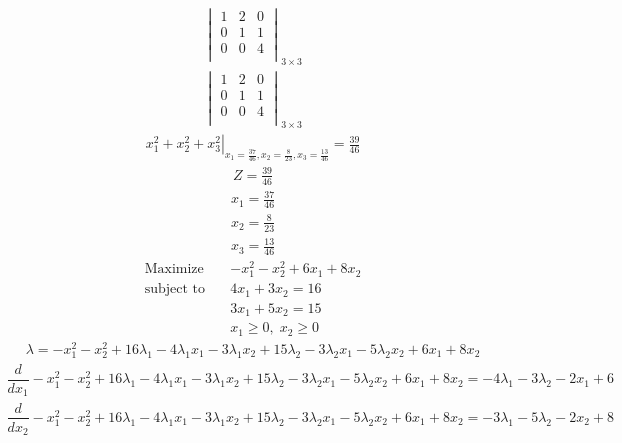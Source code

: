 \documentclass{article}
\begin{document}
\begin{align*}
\begin{vmatrix}
1 & 2 & 0\\
0 & 1 & 1\\
0 & 0 & 4\\
\end{vmatrix}_{3\times 3}
\end{align*}
\begin{align*}
\begin{vmatrix}
1 & 2 & 0\\
0 & 1 & 1\\
0 & 0 & 4\\
\end{vmatrix}_{3\times 3}
\end{align*}
\begin{align*}
\left.x_{1}^{2} + x_{2}^{2} + x_{3}^{2}\right|_{x_{1}=\frac{37}{46},x_{2}=\frac{8}{23},x_{3}=\frac{13}{46}}=\frac{39}{46}\end{align*}
\begin{align*}
Z=\frac{39}{46}\end{align*}
\begin{align*}
x_{1}=\frac{37}{46}\end{align*}
\begin{align*}
x_{2}=\frac{8}{23}\end{align*}
\begin{align*}
x_{3}=\frac{13}{46}\end{align*}
\begin{align*}
\text{Maximize} \quad & -x_{1}^{2} - x_{2}^{2} + 6x_{1} + 8x_{2}\\
\text{subject to} \quad
& 4x_{1} + 3x_{2}=16\\
& 3x_{1} + 5x_{2}=15\\
& x_{1}\ge0,\; x_{2}\ge0\end{align*}
\begin{align*}
\lambda=-x_{1}^{2} - x_{2}^{2} + 16\lambda_{1} - 4\lambda_{1}x_{1} - 3\lambda_{1}x_{2} + 15\lambda_{2} - 3\lambda_{2}x_{1} - 5\lambda_{2}x_{2} + 6x_{1} + 8x_{2}\end{align*}
\begin{align*}
\dfrac{d}{dx_{1}}-x_{1}^{2} - x_{2}^{2} + 16\lambda_{1} - 4\lambda_{1}x_{1} - 3\lambda_{1}x_{2} + 15\lambda_{2} - 3\lambda_{2}x_{1} - 5\lambda_{2}x_{2} + 6x_{1} + 8x_{2}=-4\lambda_{1} - 3\lambda_{2} - 2x_{1} + 6\end{align*}
\begin{align*}
\dfrac{d}{dx_{2}}-x_{1}^{2} - x_{2}^{2} + 16\lambda_{1} - 4\lambda_{1}x_{1} - 3\lambda_{1}x_{2} + 15\lambda_{2} - 3\lambda_{2}x_{1} - 5\lambda_{2}x_{2} + 6x_{1} + 8x_{2}=-3\lambda_{1} - 5\lambda_{2} - 2x_{2} + 8\end{align*}
\end{document}
